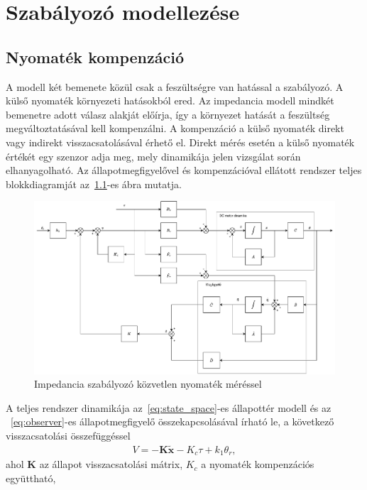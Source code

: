 \chapter{Szabályozó modellezése}\label{chap:controller}


\section{Nyomaték kompenzáció}
A modell két bemenete közül csak a feszültségre van hatással a 
szabályozó. A külső nyomaték környezeti hatásokból ered. Az impedancia 
modell mindkét bemenetre adott válasz alakját előírja, így a környezet 
hatását a feszültség megváltoztatásával kell kompenzálni. A kompenzáció
a külső nyomaték direkt vagy indirekt visszacsatolásával érhető el.
Direkt mérés esetén a külső nyomaték értékét egy szenzor adja meg, 
mely dinamikája jelen vizsgálat során elhanyagolható. Az
állapotmegfigyelővel és kompenzációval ellátott rendszer teljes 
blokkdiagramját az~\ref{fig:block_diagram_direct_compensation}-es ábra mutatja.
\begin{figure}[ht]
    \begin{center}
    \includegraphics[width=\textwidth]{images/compensated_position_control_torque.drawio.pdf}
    \caption{Impedancia szabályozó közvetlen nyomaték méréssel}\label{fig:block_diagram_direct_compensation}
    \end{center}
\end{figure}
A teljes rendszer dinamikája az~\eqref{eq:state_space}-es állapottér modell és az ~\eqref{eq:observer}-es 
állapotmegfigyelő összekapcsolásával írható le, a következő visszacsatolási összefüggéssel
\begin{align}
    V = -\bm K \tilde{\bm x} -K_c \tau + k_1 \theta_r,
\end{align}
ahol $\bm K$ az állapot visszacsatolási mátrix, $K_c$ a nyomaték kompenzációs együttható,
